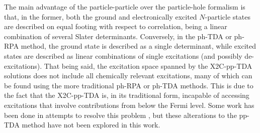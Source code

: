  
                                                                                                                                                                                                                                                              
 
The main advantage of the particle-particle over the particle-hole formalism is
that, in the former, both the ground and electronically excited $N$-particle
states are described on equal footing with respect to correlation, being a
linear combination of several Slater determinants.  Conversely, in the ph-TDA
or ph-RPA method, the ground state is described as a single determinant, while
excited states are described as linear combinations of single excitations (and
possibly de-excitations).  That being said, the excitation space spanned by the
X2C-pp-TDA solutions does not include all chemically relevant excitations, many
of which can be found using the more traditional ph-RPA or ph-TDA methods.
This is due to the fact that the X2C-pp-TDA is, in its traditional form,
incapable of accessing excitations that involve contributions from below the
Fermi level.  Some work has been done in attempts to resolve this
problem \cite{Yang13_224105}, but these alterations to the pp-TDA method have
not been explored in this work.


